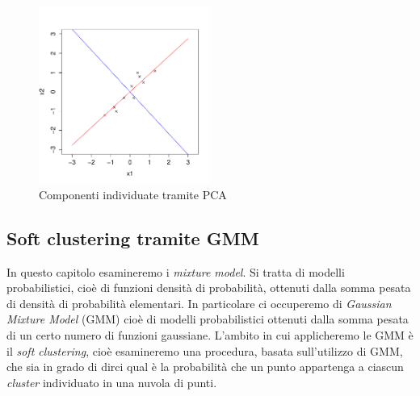 \begin{esempio}
\begin{figure}[tbp]
\centering
  \includegraphics[width=0.5\textwidth]{images/components_scaled}
  \caption{Componenti individuate tramite PCA}
  \label{fig:components_scaled}
\end{figure}
\end{esempio}

\clearpage
\subsection{Soft clustering tramite GMM}

In questo capitolo esamineremo i \emph{mixture model}. Si tratta di modelli probabilistici, cioè di funzioni densità di probabilità, ottenuti dalla somma pesata di densità di probabilità elementari. In particolare ci occuperemo di \emph{Gaussian Mixture Model} (GMM) cioè di modelli probabilistici ottenuti dalla somma pesata di un certo numero di funzioni gaussiane. L'ambito in cui applicheremo le GMM è il \emph{soft clustering}, cioè esamineremo una procedura, basata sull'utilizzo di GMM, che sia in grado di dirci qual è la probabilità che un punto appartenga a ciascun \emph{cluster} individuato in una nuvola di punti.


